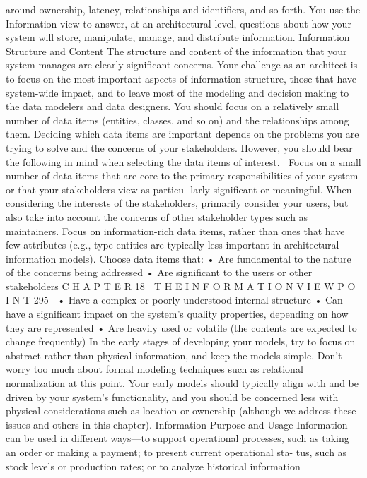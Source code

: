 around ownership, latency, relationships and identifiers, and so forth.
You use the Information view to answer, at an architectural level, questions
about how your system will store, manipulate, manage, and distribute information.
Information Structure and Content
The structure and content of the information that your system manages are
clearly significant concerns. Your challenge as an architect is to focus on the
most important aspects of information structure, those that have system-wide
impact, and to leave most of the modeling and decision making to the data
modelers and data designers.
You should focus on a relatively small number of data items (entities,
classes, and so on) and the relationships among them. Deciding which data
items are important depends on the problems you are trying to solve and the
concerns of your stakeholders. However, you should bear the following in
mind when selecting the data items of interest.
Focus on a small number of data items that are core to the primary
responsibilities of your system or that your stakeholders view as particu-
larly significant or meaningful. When considering the interests of the
stakeholders, primarily consider your users, but also take into account the
concerns of other stakeholder types such as maintainers.
Focus on information-rich data items, rather than ones that have few
attributes (e.g., type entities are typically less important in architectural
information models). Choose data items that:
• Are fundamental to the nature of the concerns being addressed
• Are significant to the users or other stakeholders
C H A P T E R 18  T H E I N F O R M A T I O N V I E W P O I N T
 295
• Have a complex or poorly understood internal structure
• Can have a significant impact on the system’s quality properties,
depending on how they are represented
• Are heavily used or volatile (the contents are expected to change
frequently)
In the early stages of developing your models, try to focus on abstract
rather than physical information, and keep the models simple. Don’t
worry too much about formal modeling techniques such as relational
normalization at this point.
Your early models should typically align with and be driven by your
system’s functionality, and you should be concerned less with physical
considerations such as location or ownership (although we address these
issues and others in this chapter).
Information Purpose and Usage
Information can be used in different ways—to support operational processes,
such as taking an order or making a payment; to present current operational sta-
tus, such as stock levels or production rates; or to analyze historical information
